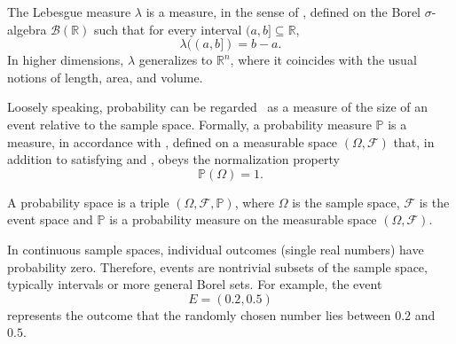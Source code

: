 \begin{definition}
	\label{def:lebesgue_measure}
	The Lebesgue measure $\lambda$ is a measure, in the sense of , defined on the Borel $\sigma$-algebra $\mathcal{B}(\mathbb{R})$ such that for every interval $(a,b] \subseteq \mathbb{R}$,
	\begin{equation}
		\lambda((a,b]) = b-a.
	\end{equation}
	In higher dimensions, $\lambda$ generalizes to $\mathbb{R}^n$, where it coincides with the usual notions of length, area, and volume.
\end{definition}

\begin{definition}
	\label{def:probability}
	Loosely speaking, probability can be regarded~\cite{chan2021introduction} as a measure of the size of an event relative to the sample space. Formally, a probability measure $\mathbb{P}$ is a measure, in accordance with , defined on a measurable space $(\Omega, \mathcal{F})$ that, in addition to satisfying  and , obeys the normalization property
	\begin{equation}
		\mathbb{P}(\Omega) = 1.
	\end{equation}
\end{definition}

\begin{definition}
	\label{def:probability_space}
	A probability space is a triple $(\Omega, \mathcal{F}, \mathbb{P})$, where $\Omega$ is the sample space,	$\mathcal{F}$ is the event space and $\mathbb{P}$ is a probability measure on the measurable space $(\Omega, \mathcal{F})$.
\end{definition}

\begin{remark}
	In continuous sample spaces, individual outcomes (single real numbers) have probability zero. Therefore, events are nontrivial subsets of the sample space, typically intervals or more general Borel sets. For example, the event 
	\begin{equation}
		E = (0.2, 0.5)
	\end{equation} 
	represents the outcome that the randomly chosen number lies between $0.2$ and $0.5$.
\end{remark}

